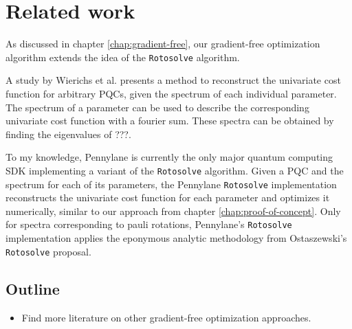 \chapter{Related work}
\label{chap:related-work}

As discussed in chapter \ref{chap:gradient-free}, our gradient-free optimization
algorithm extends the idea of the \texttt{Rotosolve}
\cite{ostaszewski_structure_2021} algorithm.

A study by Wierichs et al. \cite{wierichs_general_2022} presents a method to
reconstruct the univariate cost function for arbitrary PQCs, given the spectrum
of each individual parameter.
The spectrum of a parameter can be used to describe the corresponding univariate
cost function with a fourier sum.
These spectra can be obtained by finding the eigenvalues of ???.

To my knowledge, Pennylane \cite{bergholm_pennylane_2022} is currently the only
major quantum computing SDK implementing a variant of the \texttt{Rotosolve}
\cite{ostaszewski_structure_2021} algorithm.
Given a PQC and the spectrum for each of its parameters, the Pennylane
\texttt{Rotosolve} implementation reconstructs the univariate cost function for
each parameter and optimizes it numerically, similar to our approach from
chapter \ref{chap:proof-of-concept}.
Only for spectra corresponding to pauli rotations, Pennylane's
\texttt{Rotosolve} implementation applies the eponymous analytic methodology
from Ostaszewski's \texttt{Rotosolve} proposal.

\section{Outline}
\begin{itemize}
    \item
        Find more literature on other gradient-free optimization
        approaches.
\end{itemize}